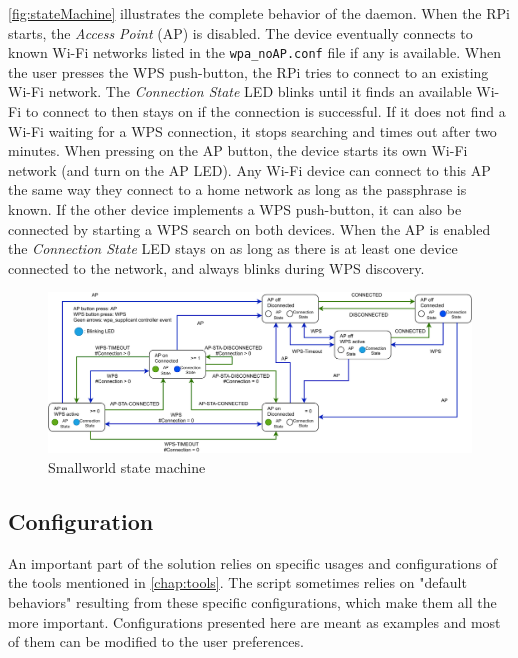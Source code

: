 \documentclass[a4paper,11pt,oneside]{report}
\begin{document}
\autoref{fig:stateMachine} illustrates the complete behavior of the daemon. When the RPi starts, the \emph{Access Point} (AP) is disabled. The device eventually connects to known Wi-Fi networks listed in the \verb|wpa_noAP.conf| file if any is available. When the user presses the WPS push-button, the RPi tries to connect to an existing Wi-Fi network. The \emph{Connection State} LED blinks until it finds an available Wi-Fi to connect to then stays on if the connection is successful. If it does not find a Wi-Fi waiting for a WPS connection, it stops searching and times out after two minutes. When pressing on the AP button, the device starts its own Wi-Fi network (and turn on the AP LED). Any Wi-Fi device can connect to this AP the same way they connect to a home network as long as the passphrase is known. If the other device implements a WPS push-button, it can also be connected by starting a WPS search on both devices. When the AP is enabled the \emph{Connection State} LED stays on as long as there is at least one device connected to the network, and always blinks during WPS discovery.
\begin{figure}
  \includegraphics[width=\linewidth]{figures/stateMachine.pdf}
  \caption{Smallworld state machine}
  \label{fig:stateMachine}
\end{figure}

\subsection{Configuration}
\label{chap:conf}

An important part of the solution relies on specific usages and configurations of the tools mentioned in \autoref{chap:tools}. The script sometimes relies on "default behaviors" resulting from these specific configurations, which make them all the more important. Configurations presented here are meant as examples and most of them can be modified to the user preferences.
\end{document}
